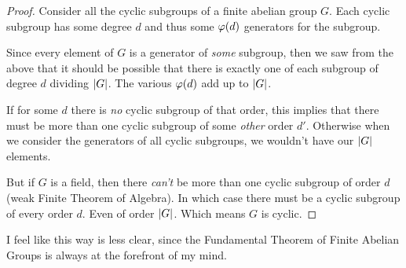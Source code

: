 \begin{proof}
  Consider all the cyclic subgroups of a finite abelian group $G$. Each
  cyclic subgroup has some degree $d$ and thus some $\varphi\mathopen{}\left( {d} \right)\mathclose{}$
  generators for the subgroup.

  Since every element of $G$ is a generator of \emph{some} subgroup,
  then we saw from the above that it should be possible that there is
  exactly one of each subgroup of degree $d$ dividing $|G|$. The
  various $\varphi\mathopen{}\left( {d} \right)\mathclose{}$ add up to $|G|$.

  If for some $d$ there is \emph{no} cyclic subgroup of that order, this
  implies that there must be more than one cyclic subgroup of some
  \emph{other} order $d'$. Otherwise when we consider the generators of
  all cyclic subgroups, we wouldn't have our $|G|$ elements.

  But if $G$ is a field, then there \emph{can't} be more than one cyclic
  subgroup of order $d$ (weak Finite Theorem of Algebra). In which case
  there must be a cyclic subgroup of every order $d$. Even of order
  $|G|$. Which means $G$ is cyclic.
\end{proof}

\begin{remark}
  I feel like this way is less clear, since the Fundamental Theorem of
  Finite Abelian Groups is always at the forefront of my mind.
\end{remark}

%
%
%
%
%
%
%
%
%
